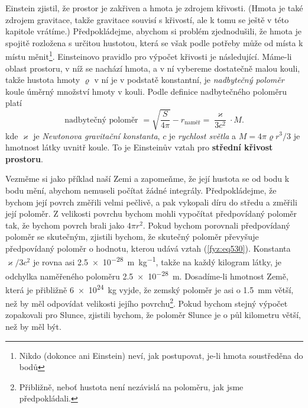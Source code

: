 {    Einstein zjistil, že prostor je zakřiven a hmota je zdrojem křivosti. (Hmota je také zdrojem 
    gravitace, takže gravitace souvisí s křivostí, ale k tomu se ještě v této kapitole vrátíme.) 
    Předpokládejme, abychom si problém zjednodušili, že hmota je spojitě rozložena s určitou 
    hustotou, která se však podle potřeby může od místa k místu měnit\footnote{Nikdo (dokonce ani 
    Einstein) neví, jak postupovat, je-li hmota soustředěna do bodů}. Einsteinovo pravidlo pro 
    výpočet křivosti je následující. Máme-li oblast prostoru, v níž se nachází hmota, a v ní 
    vybereme dostatečně malou kouli, takže hustota hmoty \(\varrho\) v ní je v podstatě konstantní, 
    je \emph{nadbytečný poloměr} koule úměrný množství hmoty v kouli. Podle definice nadbytečného 
    poloměru platí
    \begin{equation}\label{fyz:eq530}
      \text{nadbytečný poloměr } = \sqrt{\dfrac{S}{4\pi}} - r_\text{naměř} 
                                 = \dfrac{\varkappa}{3c^2}\cdot M.
    \end{equation}
    kde \(\varkappa\) je \emph{Newtonova gravitační konstanta}, \(c\) je \emph{rychlost světla} a 
    \(M=4\pi\varrho r^3/3\) je hmotnost látky uvnitř koule. To je Einsteinův vztah pro 
    \textbf{střední křivost prostoru}. 
    
    Vezměme si jako příklad naší Zemi a zapomeňme, že její hustota se od bodu k bodu mění, abychom 
    nemuseli počítat žádné integrály. Předpokládejme, že bychom její povrch změřili velmi pečlivě, 
    a pak vykopali díru do středu a změřili její poloměr. Z velikosti povrchu bychom mohli 
    vypočítat předpovídaný poloměr tak, že bychom povrch brali jako \(4\pi r^2\). Pokud bychom 
    porovnali předpovídaný poloměr se skutečným, zjistili bychom, že skutečný poloměr převyšuje 
    předpovídaný poloměr o hodnotu, kterou udává vztah (\ref{fyz:eq530}). Konstanta 
    \(\varkappa/3c^2\) 
    je rovna asi \SI{2.5e-28}{\m\per\kg}, takže na každý kilogram látky, je odchylka naměřeného 
    poloměru \SI{2.5e-28}{\m}. Dosadíme-li hmotnost Země, která je přibližně \SI{6e24}{\kg} vyjde, 
    že zemský poloměr je asi o \SI{1.5}{\mm} větší, než by měl odpovídat velikosti jejího 
    povrchu\footnote{Přibližně, neboť hustota není nezávislá na poloměru, jak jsme předpokládali.}. 
    Pokud bychom stejný výpočet zopakovali pro Slunce, zjistili bychom, že poloměr Slunce je o půl 
    kilometru větší, než by měl být. 
    
}
